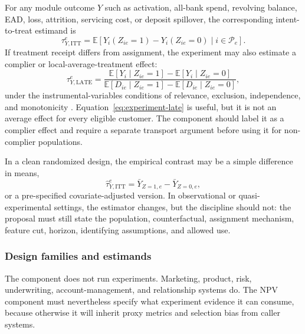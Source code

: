 \documentclass[11pt]{article}
\newcommand{\E}{\mathbb{E}}
\newcommand{\1}{\mathbf{1}}
\begin{document}
For any module outcome $Y$ such as activation, all-bank spend, revolving
balance, EAD, loss, attrition, servicing cost, or deposit spillover, the
corresponding intent-to-treat estimand is
\begin{equation}
  \tau^{e}_{Y,\mathrm{ITT}}
  =
  \E[Y_i(Z_{ie}=1)-Y_i(Z_{ie}=0)\mid i\in\mathcal{P}_e].
  \label{eq:experiment-itt}
\end{equation}
If treatment receipt differs from assignment, the experiment may also estimate
a complier or local-average-treatment effect:
\begin{equation}
  \tau^{e}_{Y,\mathrm{LATE}}
  =
  \frac{\E[Y_i\mid Z_{ie}=1]-\E[Y_i\mid Z_{ie}=0]}
       {\E[D_{ie}\mid Z_{ie}=1]-\E[D_{ie}\mid Z_{ie}=0]},
  \label{eq:experiment-late}
\end{equation}
under the instrumental-variables conditions of relevance, exclusion,
independence, and monotonicity
\citep{angristimbensrubin1996iv}. Equation~\eqref{eq:experiment-late} is
useful, but it is not an average effect for every eligible customer. The
component should label it as a complier effect and require a separate
transport argument before using it for non-complier populations.

In a clean randomized design, the empirical contrast may be a simple
difference in means,
\begin{equation}
  \widehat{\tau}^{e}_{Y,\mathrm{ITT}}
  =
  \bar{Y}_{Z=1,e}-\bar{Y}_{Z=0,e},
  \label{eq:experiment-contrast}
\end{equation}
or a pre-specified covariate-adjusted version. In observational or
quasi-experimental settings, the estimator changes, but the discipline should
not: the proposal must still state the population, counterfactual, assignment
mechanism, feature cut, horizon, identifying assumptions, and allowed use.

\subsubsection{Design families and estimands}

The component does not run experiments. Marketing, product, risk,
underwriting, account-management, and relationship systems do. The NPV
component must nevertheless specify what experiment evidence it can consume,
because otherwise it will inherit proxy metrics and selection bias from caller
systems.
\end{document}
